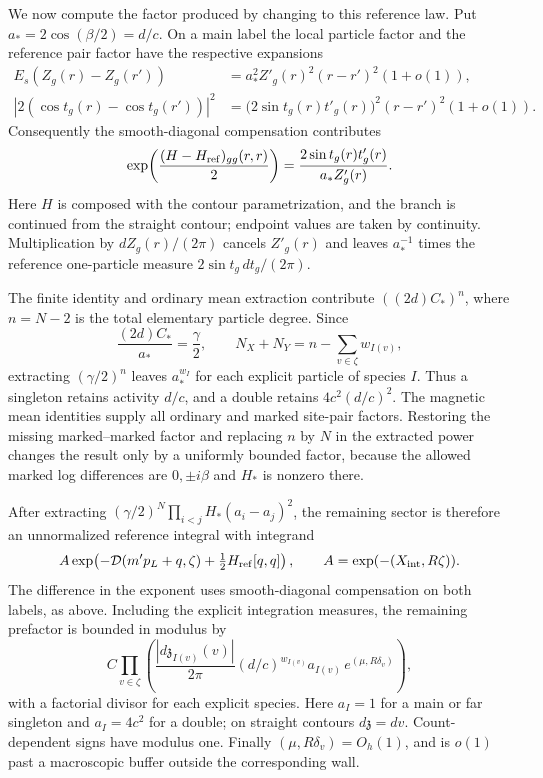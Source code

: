 We now compute the factor produced by changing to this reference law.
Put $a_*=2\cos(\beta/2)=d/c$. On a main label the local particle
factor and the reference pair factor have the respective expansions
\[
\begin{aligned}
 E_s(Z_g(r)-Z_g(r'))
   &=a_*^2Z'_g(r)^2(r-r')^2(1+o(1)),\\
 |2(\cos t_g(r)-\cos t_g(r'))|^2
   &=\bigl(2\sin t_g(r)t'_g(r)\bigr)^2(r-r')^2(1+o(1)).
\end{aligned}
\]
Consequently the smooth-diagonal compensation contributes
\[
 \exp\!\left(\frac{(H-H_{\rm ref})_{gg}(r,r)}2\right)
 =\frac{2\sin t_g(r)t'_g(r)}{a_*Z'_g(r)}.
\]
Here $H$ is composed with the contour parametrization, and the branch
is continued from the straight contour; endpoint values are taken by
continuity. Multiplication by $dZ_g(r)/(2\pi)$ cancels $Z'_g(r)$
and leaves $a_*^{-1}$ times the reference one-particle measure
$2\sin t_g\,dt_g/(2\pi)$.

The finite identity and ordinary mean extraction contribute
$((2d)C_*)^n$, where $n=N-2$ is the total elementary particle degree.
Since
\[
 \frac{(2d)C_*}{a_*}=\frac\gamma2,
 \qquad
 N_X+N_Y=n-\sum_{v\in\zeta}w_{I(v)},
\]
extracting $(\gamma/2)^n$ leaves $a_*^{w_I}$ for each explicit
particle of species $I$. Thus a singleton retains activity $d/c$,
and a double retains $4c^2(d/c)^2$. The magnetic mean identities
supply all ordinary and marked site-pair factors. Restoring the
missing marked--marked factor and replacing $n$ by $N$ in the
extracted power changes the result only by a uniformly bounded
factor, because the allowed marked log differences are $0,\pm i\beta$
and $H_*$ is nonzero there.

After extracting $(\gamma/2)^N\prod_{i<j}H_*(a_i-a_j)^2$, the
remaining sector is therefore an unnormalized reference integral
with integrand
\[
 A\exp\!\left(-\mathcal D(m'p_L+q,\zeta)
                       +\tfrac12H_{\rm ref}[q,q]\right),
 \qquad A=\exp(-(X_{\rm int},R\zeta)).
\]
The difference in the exponent uses smooth-diagonal compensation on
both labels, as above. Including the explicit integration measures,
the remaining prefactor is bounded in modulus by
\[
 C\prod_{v\in\zeta}
 \left(\frac{|d\mathfrak z_{I(v)}(v)|}{2\pi}
 (d/c)^{w_{I(v)}} a_{I(v)}\,e^{(\mu,R\delta_v)}\right),
\]
with a factorial divisor for each explicit species. Here $a_I=1$ for
a main or far singleton and $a_I=4c^2$ for a double; on straight
contours $d\mathfrak z=dv$. Count-dependent signs have modulus one.
Finally $(\mu,R\delta_v)=O_h(1)$, and is $o(1)$ past a macroscopic
buffer outside the corresponding wall.


